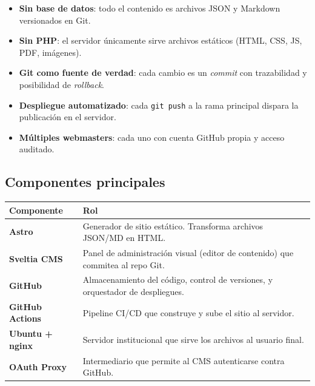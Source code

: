 \documentclass[11pt,a4paper]{article}
\begin{document}
\begin{callout}[title=Cambios clave respecto al modelo anterior]
\begin{itemize}[leftmargin=*, noitemsep]
  \item \textbf{Sin base de datos}: todo el contenido es archivos JSON y Markdown versionados en Git.
  \item \textbf{Sin PHP}: el servidor únicamente sirve archivos estáticos (HTML, CSS, JS, PDF, imágenes).
  \item \textbf{Git como fuente de verdad}: cada cambio es un \textit{commit} con trazabilidad y posibilidad de \textit{rollback}.
  \item \textbf{Despliegue automatizado}: cada \texttt{git push} a la rama principal dispara la publicación en el servidor.
  \item \textbf{Múltiples webmasters}: cada uno con cuenta GitHub propia y acceso auditado.
\end{itemize}
\end{callout}

\subsection{Componentes principales}

\begin{center}
\begin{tabular}{@{}lp{10cm}@{}}
\toprule
\textbf{Componente} & \textbf{Rol} \\
\midrule
\textbf{Astro} & Generador de sitio estático. Transforma archivos JSON/MD en HTML. \\
\textbf{Sveltia CMS} & Panel de administración visual (editor de contenido) que commitea al repo Git. \\
\textbf{GitHub} & Almacenamiento del código, control de versiones, y orquestador de despliegues. \\
\textbf{GitHub Actions} & Pipeline CI/CD que construye y sube el sitio al servidor. \\
\textbf{Ubuntu + nginx} & Servidor institucional que sirve los archivos al usuario final. \\
\textbf{OAuth Proxy} & Intermediario que permite al CMS autenticarse contra GitHub. \\
\bottomrule
\end{tabular}
\end{center}

\newpage

\end{document}
